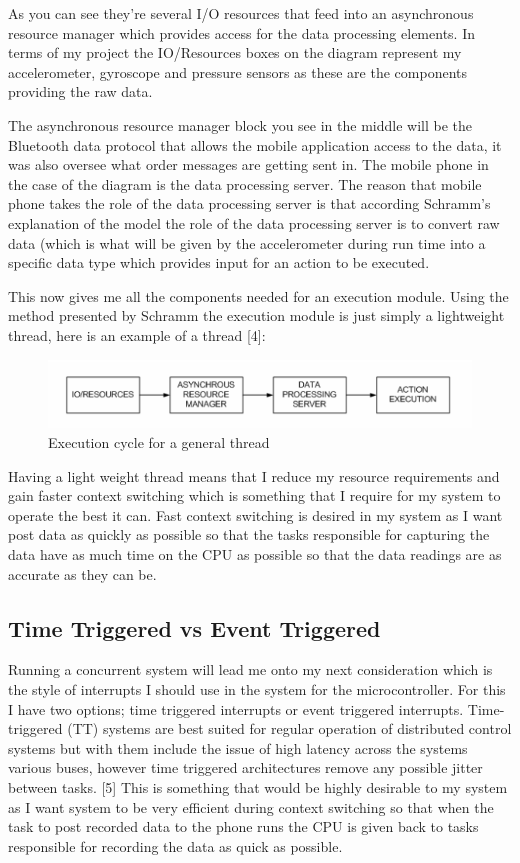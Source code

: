 As you can see they’re several I/O resources that feed into an asynchronous resource manager which provides access for the data processing elements. In terms of my project the IO/Resources boxes on the diagram represent my accelerometer, gyroscope and pressure sensors as these are the components providing the raw data. 

The asynchronous resource manager block you see in the middle will be the Bluetooth data protocol that allows the mobile application access to the data, it was also oversee what order messages are getting sent in. The mobile phone in the case of the diagram is the data processing server. The reason that mobile phone takes the role of the data processing server is that according Schramm’s explanation of the model the role of the data processing server is to convert raw data (which is what will be given by the accelerometer during run time into a specific data type which provides input for an action to be executed. 

This now gives me all the components needed for an execution module. Using the method presented by Schramm the execution module is just simply a lightweight thread, here is an example of a thread [4]:
\begin{figure}[h]
\begin{center}
\includegraphics[width=.75\textwidth]{ANALYSIS/fig2.png}
\end{center}
\caption{Execution cycle for a general thread}
\end{figure}

Having a light weight thread means that I reduce my resource requirements and gain faster context switching which is something that I require for my system to operate the best it can. Fast context switching is desired in my system as I want post data as quickly as possible so that the tasks responsible for capturing the data have as much time on the CPU as possible so that the data readings are as accurate as they can be.

\subsection{Time Triggered vs Event Triggered}\label{analysis:esttvset}
Running a concurrent system will lead me onto my next consideration which is the style of interrupts I should use in the system for the microcontroller. For this I have two options; time triggered interrupts or event triggered interrupts. Time- triggered (TT) systems are best suited for regular operation of distributed control systems but with them include the issue of high latency across the systems various buses, however time triggered architectures remove any possible jitter between tasks. [5] This is something that would be highly desirable to my system as I want system to be very efficient during context switching so that when the task to post recorded data to the phone runs the CPU is given back to tasks responsible for recording the data as quick as possible. 

